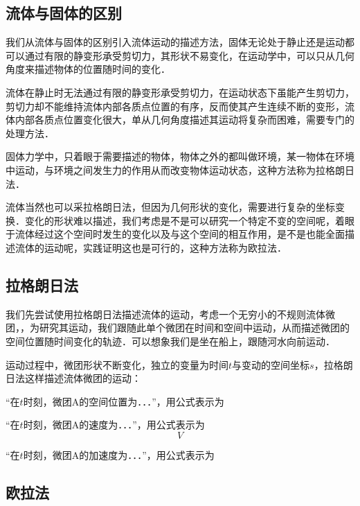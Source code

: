 
\subsection{流体与固体的区别}
我们从流体与固体的区别引入流体运动的描述方法，固体无论处于静止还是运动都可以通过有限的静变形承受剪切力，其形状不易变化，在运动学中，可以只从几何角度来描述物体的位置随时间的变化．

流体在静止时无法通过有限的静变形承受剪切力，在运动状态下虽能产生剪切力，剪切力却不能维持流体内部各质点位置的有序，反而使其产生连续不断的变形，流体内部各质点位置变化很大，单从几何角度描述其运动将复杂而困难，需要专门的处理方法．

固体力学中，只着眼于需要描述的物体，物体之外的都叫做环境，某一物体在环境中运动，与环境之间发生力的作用从而改变物体运动状态，这种方法称为拉格朗日法．

流体当然也可以采拉格朗日法，但因为几何形状的变化，需要进行复杂的坐标变换．变化的形状难以描述，我们考虑是不是可以研究一个特定不变的空间呢，着眼于流体经过这个空间时发生的变化以及与这个空间的相互作用，是不是也能全面描述流体的运动呢，实践证明这也是可行的，这种方法称为欧拉法．

\subsection{拉格朗日法}
我们先尝试使用拉格朗日法描述流体的运动，考虑一个无穷小的不规则流体微团，，为研究其运动，我们跟随此单个微团在时间和空间中运动，从而描述微团的空间位置随时间变化的轨迹．可以想象我们是坐在船上，跟随河水向前运动．

运动过程中，微团形状不断变化，独立的变量为时间$t$与变动的空间坐标$s$，拉格朗日法这样描述流体微团的运动：

“在$t$时刻，微团A的空间位置为．．．”，用公式表示为

“在$t$时刻，微团A的速度为．．．”，用公式表示为
\begin{equation}
V
\end{equation}

“在$t$时刻，微团A的加速度为．．．”，用公式表示为

\subsection{欧拉法}